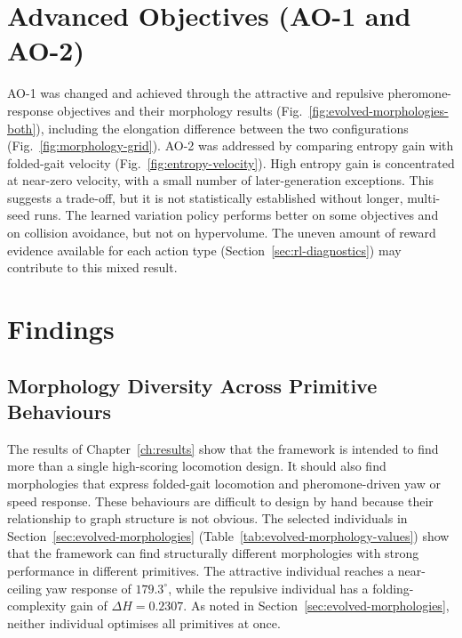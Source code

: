\documentclass[12pt,a4paper]{report}
\begin{document}
\section{Advanced Objectives (AO-1 and AO-2)}
\label{sec:disc-advanced}
AO-1 was changed and achieved through the attractive and repulsive pheromone-response objectives and their morphology results (Fig.~\ref{fig:evolved-morphologies-both}), including the elongation difference between the two configurations (Fig.~\ref{fig:morphology-grid}). AO-2 was addressed by comparing entropy gain with folded-gait velocity (Fig.~\ref{fig:entropy-velocity}). High entropy gain is concentrated at near-zero velocity, with a small number of later-generation exceptions. This suggests a trade-off, but it is not statistically established without longer, multi-seed runs. The learned variation policy performs better on some objectives and on collision avoidance, but not on hypervolume. The uneven amount of reward evidence available for each action type (Section~\ref{sec:rl-diagnostics}) may contribute to this mixed result.

\section{Findings}
\label{sec:findings}

\subsection{Morphology Diversity Across Primitive Behaviours}
The results of Chapter~\ref{ch:results} show that the framework is intended to find more than a single high-scoring locomotion design. It should also find morphologies that express folded-gait locomotion and pheromone-driven yaw or speed response. These behaviours are difficult to design by hand because their relationship to graph structure is not obvious. The selected individuals in Section~\ref{sec:evolved-morphologies} (Table~\ref{tab:evolved-morphology-values}) show that the framework can find structurally different morphologies with strong performance in different primitives. The attractive individual reaches a near-ceiling yaw response of $179.3^{\circ}$, while the repulsive individual has a folding-complexity gain of $\Delta H = 0.2307$. As noted in Section~\ref{sec:evolved-morphologies}, neither individual optimises all primitives at once.
\end{document}
